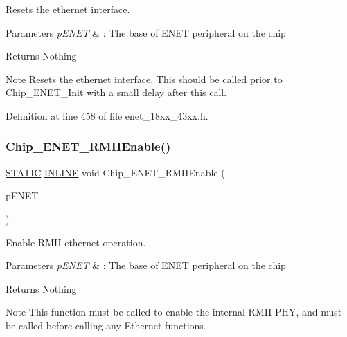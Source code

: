 Resets the ethernet interface. 


\begin{DoxyParams}{Parameters}
{\em p\+E\+N\+ET} & \+: The base of E\+N\+ET peripheral on the chip \\
\hline
\end{DoxyParams}
\begin{DoxyReturn}{Returns}
Nothing 
\end{DoxyReturn}
\begin{DoxyNote}{Note}
Resets the ethernet interface. This should be called prior to Chip\+\_\+\+E\+N\+E\+T\+\_\+\+Init with a small delay after this call. 
\end{DoxyNote}


Definition at line 458 of file enet\+\_\+18xx\+\_\+43xx.\+h.

\mbox{\label{group___e_n_e_t__18_x_x__43_x_x_ga779524b9b8e472f0ba1c3a703ca177fc}} 
\subsubsection{\texorpdfstring{Chip\+\_\+\+E\+N\+E\+T\+\_\+\+R\+M\+I\+I\+Enable()}{Chip\_ENET\_RMIIEnable()}}
{\footnotesize\ttfamily \hyperlink{group___l_p_c___types___public___macros_ga10b2d890d871e1489bb02b7e70d9bdfb}{S\+T\+A\+T\+IC} \hyperlink{spifi__18xx__43xx_8h_a2eb6f9e0395b47b8d5e3eeae4fe0c116}{I\+N\+L\+I\+NE} void Chip\+\_\+\+E\+N\+E\+T\+\_\+\+R\+M\+I\+I\+Enable (\begin{DoxyParamCaption}\item[{\hyperlink{struct_l_p_c___e_n_e_t___t}{L\+P\+C\+\_\+\+E\+N\+E\+T\+\_\+T} $\ast$}]{p\+E\+N\+ET }\end{DoxyParamCaption})}



Enable R\+M\+II ethernet operation. 


\begin{DoxyParams}{Parameters}
{\em p\+E\+N\+ET} & \+: The base of E\+N\+ET peripheral on the chip \\
\hline
\end{DoxyParams}
\begin{DoxyReturn}{Returns}
Nothing 
\end{DoxyReturn}
\begin{DoxyNote}{Note}
This function must be called to enable the internal R\+M\+II P\+HY, and must be called before calling any Ethernet functions. 
\end{DoxyNote}


